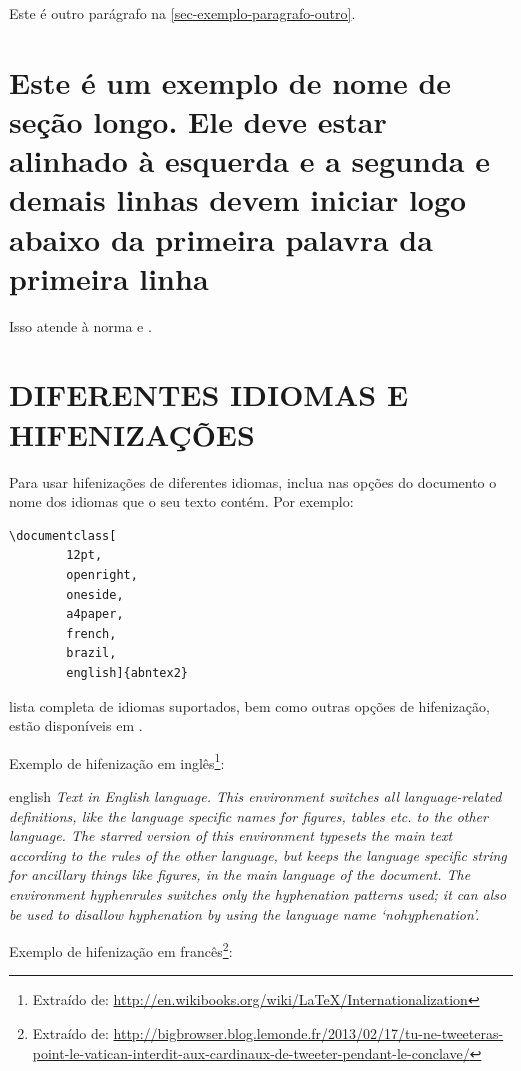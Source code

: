 Este é outro parágrafo na \autoref{sec-exemplo-paragrafo-outro}. 



\section{Este é um exemplo de nome de seção longo. Ele deve estar
alinhado à esquerda e a segunda e demais linhas devem iniciar logo abaixo da
primeira palavra da primeira linha}

Isso atende à norma  
 e .

\section{\uppercase{Diferentes idiomas e hifenizações}}
\label{sec-hifenizacao}

Para usar hifenizações de diferentes idiomas, inclua nas opções do documento o
nome dos idiomas que o seu texto contém. Por exemplo:

\begin{verbatim}
\documentclass[
		12pt,
	    openright,
	    oneside,
	    a4paper,
	    french,
	    brazil,
	    english]{abntex2}
\end{verbatim}

 lista completa de idiomas suportados, bem como outras opções de hifenização,
estão disponíveis em .

Exemplo de hifenização em inglês\footnote{Extraído de:
\url{http://en.wikibooks.org/wiki/LaTeX/Internationalization}}:

\begin{otherlanguage*}{english}
\textit{Text in English language. This environment switches all language-related
definitions, like the language specific names for figures, tables etc. to the other
language. The starred version of this environment typesets the main text
according to the rules of the other language, but keeps the language specific
string for ancillary things like figures, in the main language of the document.
The environment hyphenrules switches only the hyphenation patterns used; it can
also be used to disallow hyphenation by using the language name
`nohyphenation'.}
\end{otherlanguage*}

Exemplo de hifenização em francês\footnote{Extraído de:
\url{http://bigbrowser.blog.lemonde.fr/2013/02/17/tu-ne-tweeteras-point-le-vatican-interdit-aux-cardinaux-de-tweeter-pendant-le-conclave/}}:


